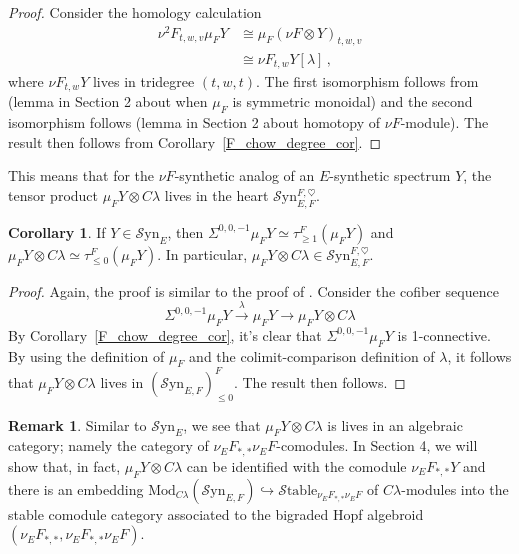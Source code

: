 \documentclass[10pt]{amsart}
\theoremstyle{definition}
\numberwithin{figure}{section}
\numberwithin{equation}{section}
\newtheorem{corollary}[figure]{Corollary}
\newtheorem{remark}[figure]{Remark}
\theoremstyle{cited}
\newcommand{\Mod}{\mathrm{Mod}}
\newcommand{\Syn}{\mathcal{S}\mathrm{yn}}
\newcommand{\Stable}{\mathcal{S}\mathrm{table}}
\begin{document}
  \begin{proof}
      Consider the homology calculation
  \begin{equation*}
      \begin{aligned}
          \nu^2F_{t,w,v}\mu_FY &\cong \mu_F(\nu F\otimes Y)_{t,w,v} \\
          &\cong \nu F_{t,w} Y[\lambda]\, ,
      \end{aligned}
  \end{equation*}
  where $\nu F_{t,w} Y$ lives in tridegree $(t,w,t)$. The first isomorphism follows from (lemma in Section 2 about when $\mu_F$ is symmetric monoidal) and the second isomorphism follows (lemma in Section 2 about homotopy of $\nu F$-module). The result then follows from Corollary~\ref{F_chow_degree_cor}.
  \end{proof}
  
  This means that for the $\nu F$-synthetic analog of an $E$-synthetic spectrum $Y$, the tensor product $\mu_FY\otimes C\lambda$ lives in the heart $\Syn_{E,F}^{F,\heartsuit}$.
  
  \begin{corollary}
  If $Y\in\Syn_E$, then $\Sigma^{0,0,-1}\mu_FY\simeq \tau_{\geq 1}^F(\mu_FY)$ and $\mu_F Y\otimes C\lambda\simeq \tau_{\leq 0}^F(\mu_FY)$. In particular, $\mu_FY\otimes C\lambda\in \Syn_{E,F}^{F,\heartsuit}$.  
  \end{corollary}
  
  \begin{proof}
     Again, the proof is similar to the proof of \cite[Lemma 4.29]{Pst22}. Consider the cofiber sequence
     $$
  \Sigma^{0,0,-1}\mu_FY\xrightarrow{\lambda}\mu_FY\to \mu_FY\otimes C\lambda
     $$
     By Corollary~\ref{F_chow_degree_cor}, it's clear that $\Sigma^{0,0,-1}\mu_FY$ is 1-connective. By using the definition of $\mu_F$ and the colimit-comparison definition of $\lambda$, it follows that $\mu_FY\otimes C\lambda$ lives in $(\Syn_{E,F})_{\leq 0}^F$. The result then follows.
  \end{proof}
  
  \begin{remark}
  Similar to $\Syn_E$, we see that $\mu_FY\otimes C\lambda$ is lives in an algebraic category; namely the category of $\nu_EF_{*,*}\nu_E F$-comodules. In Section 4, we will show that, in fact, $\mu_FY\otimes C\lambda$ can be identified with the comodule $\nu_{E}F_{*,*}Y$ and there is an embedding $\Mod_{C\lambda}(\Syn_{E,F})\hookrightarrow \Stable_{\nu_EF_{*,*}\nu_EF}$ of $C\lambda$-modules into the stable comodule category associated to the bigraded Hopf algebroid $(\nu_EF_{*,*},\nu_EF_{*,*}\nu_EF)$.    
  \end{remark}
  
\end{document}
